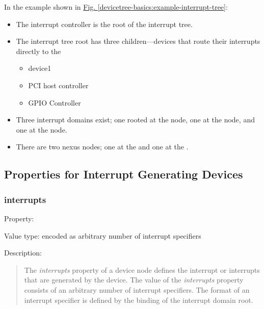\documentclass[a4paper,10pt,oneside]{sphinxmanual}
\begin{document}
In the example shown in \hyperref[devicetree-basics:example-interrupt-tree]{Fig. \ref{devicetree-basics:example-interrupt-tree}}:
\begin{itemize}
\item {} 
The  interrupt controller is the root of the interrupt tree.

\item {} 
The interrupt tree root has three children—devices that route their
interrupts directly to the 
\begin{itemize}
\item {} 
device1

\item {} 
PCI host controller

\item {} 
GPIO Controller

\end{itemize}

\item {} 
Three interrupt domains exist; one rooted at the  node,
one at the  node, and one at the
 node.

\item {} 
There are two nexus nodes; one at the  and one at
the .

\end{itemize}


\subsection{Properties for Interrupt Generating Devices}
\label{devicetree-basics:properties-for-interrupt-generating-devices}

\subsubsection{interrupts}
\label{devicetree-basics:interrupts}
Property: 

Value type:  encoded as arbitrary number of
interrupt specifiers

Description:
\begin{quote}

The \emph{interrupts} property of a device node defines the interrupt or
interrupts that are generated by the device. The value of the
\emph{interrupts} property consists of an arbitrary number of interrupt
specifiers. The format of an interrupt specifier is defined by the
binding of the interrupt domain root.
\end{quote}
\end{document}
